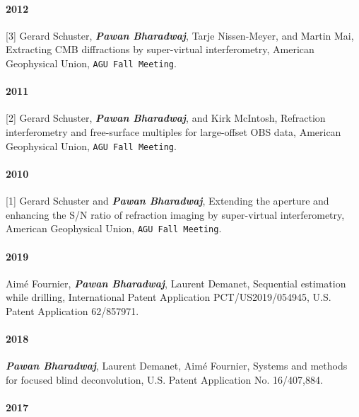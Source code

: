 \documentclass[9pt]{developercv} %
\begin{document}
\paragraph{2012}\label{section-39}

{[}3{]}
Gerard
Schuster,
\textbf{\emph{Pawan
Bharadwaj}},
Tarje
Nissen-Meyer,
and Martin
Mai,
Extracting
CMB
diffractions
by
super-virtual
interferometry,
American
Geophysical
Union,
\texttt{AGU\ Fall\ Meeting}.

\paragraph{2011}\label{section-40}

{[}2{]}
Gerard
Schuster,
\textbf{\emph{Pawan
Bharadwaj}},
and Kirk
McIntosh,
Refraction
interferometry
and
free-surface
multiples
for
large-offset
OBS data,
American
Geophysical
Union,
\texttt{AGU\ Fall\ Meeting}.

\paragraph{2010}\label{section-41}

{[}1{]}
Gerard
Schuster
and
\textbf{\emph{Pawan
Bharadwaj}},
Extending
the
aperture
and
enhancing
the S/N
ratio of
refraction
imaging by
super-virtual
interferometry,
American
Geophysical
Union,
\texttt{AGU\ Fall\ Meeting}.

\label{patents}

\paragraph{2019}\label{section-42}

Aimé
Fournier,
\textbf{\emph{Pawan
Bharadwaj}},
Laurent
Demanet,
Sequential
estimation
while
drilling,
International
Patent
Application
PCT/US2019/054945,
U.S.
Patent
Application
62/857971.

\paragraph{2018}\label{section-43}

\textbf{\emph{Pawan
Bharadwaj}},
Laurent
Demanet,
Aimé
Fournier,
Systems
and
methods
for
focused
blind
deconvolution,
U.S.
Patent
Application
No.
16/407,884.

\paragraph{2017}\label{section-44}
\end{document}
